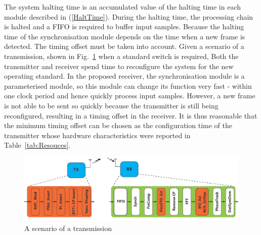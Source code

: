 The system halting time is an accumulated value of the halting time in each module described in (\ref{HaltTime}). During the halting time, the processing chain is halted and a FIFO is required to buffer input samples. Because the halting time of the synchronisation module depends on the time when a new frame is detected. The timing offset must be taken into account. Given a scenario of a transmission, shown in Fig.~\ref{fig:tx-rx} when a standard switch is required, Both the transmitter and receiver spend time to reconfigure the system for the new operating standard. In the proposed receiver, the synchronisation module is a parameterised module, so this module can change its function very fast - within one clock period and hence quickly process input samples. However, a new frame is not able to be sent so quickly because the transmitter is still being reconfigured, resulting in a timing offset in the receiver. It is thus reasonable that the minimum timing offset can be chosen as the configuration time of the transmitter whose hardware characteristics were reported in Table~\ref{tab:Resouces}.
\begin{figure}
\centering
\includegraphics [width=1\columnwidth]{Figures/CR_Tx-Rx.pdf}
\caption{A scenario of a transmission}
\label{fig:tx-rx}
\end{figure}

